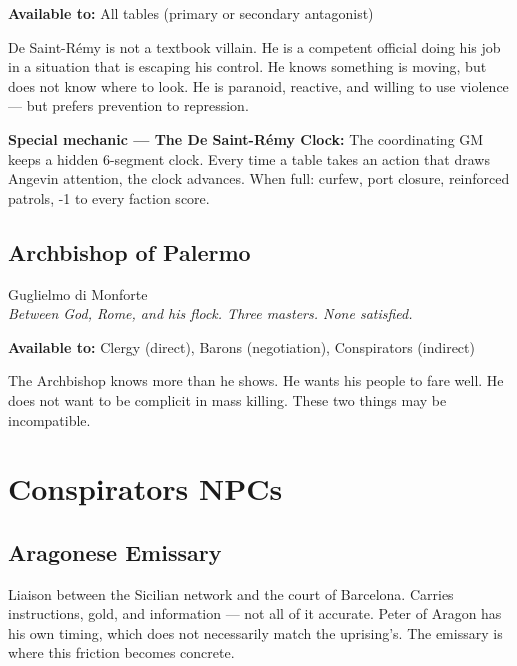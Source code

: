 
\textbf{Available to:} All tables (primary or secondary antagonist)

De Saint-Rémy is not a textbook villain. He is a competent official
doing his job in a situation that is escaping his control. He knows
something is moving, but does not know where to look. He is paranoid,
reactive, and willing to use violence --- but prefers prevention to
repression.

\textbf{Special mechanic --- The De Saint-Rémy Clock:} The coordinating
GM keeps a hidden 6-segment clock. Every time a table takes an action
that draws Angevin attention, the clock advances. When full: curfew,
port closure, reinforced patrols, -1 to every faction score.

\filetto

\subsection{Archbishop of Palermo}
{\cinzel\footnotesize\color{grigionote} Guglielmo di Monforte}\\
\textit{Between God, Rome, and his flock. Three masters. None satisfied.}


\textbf{Available to:} Clergy (direct), Barons (negotiation),
Conspirators (indirect)

The Archbishop knows more than he shows. He wants his people to fare
well. He does not want to be complicit in mass killing. These two things
may be incompatible.

\secsep

\section{Conspirators NPCs}

\subsection{Aragonese Emissary}

Liaison between the Sicilian network and the court of Barcelona.
Carries instructions, gold, and information --- not all of it accurate.
Peter of Aragon has his own timing, which does not necessarily match
the uprising's. The emissary is where this friction becomes concrete.

